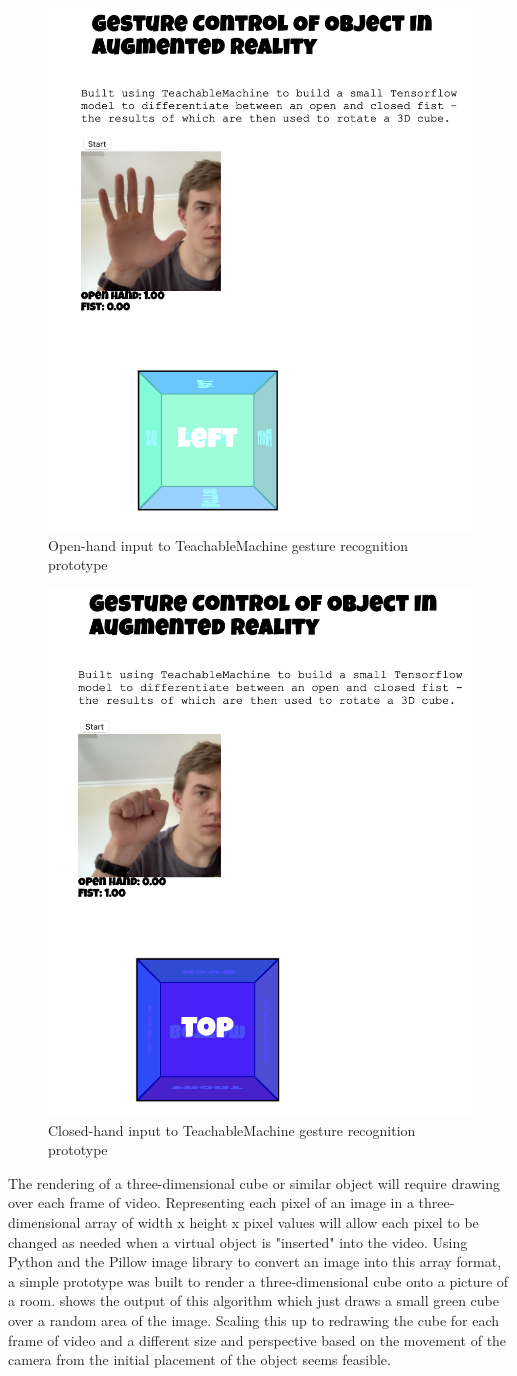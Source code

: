 \begin{figure}[!ht]
  \centering
  \includegraphics[width=0.4\linewidth]{figures/teachable_machine_1.png}
  \caption{Open-hand input to TeachableMachine gesture recognition prototype}
  \label{fig:teachablemachine1}
\end{figure}
\begin{figure}[!ht]
    \centering
    \includegraphics[width=0.4\linewidth]{figures/teachable_machine_2.png}
    \caption{Closed-hand input to TeachableMachine gesture recognition prototype}
    \label{fig:teachablemachine2}
\end{figure}

The rendering of a three-dimensional cube or similar object will require drawing over each frame of video. Representing each pixel of an image in a three-dimensional array of width x height x pixel values will allow each pixel to be changed as needed when a virtual object is "inserted" into the video. Using Python and the Pillow image library to convert an image into this array format, a simple prototype was built to render a three-dimensional cube onto a picture of a room.  shows the output of this algorithm which just draws a small green cube over a random area of the image. Scaling this up to redrawing the cube for each frame of video and a different size and perspective based on the movement of the camera from the initial placement of the object seems feasible. \newline

